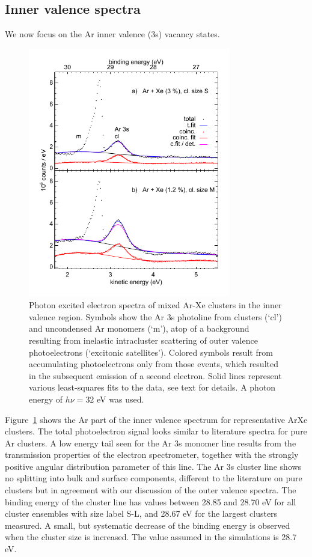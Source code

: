 \subsection{Inner valence spectra}
%
We now focus on the Ar inner valence (3s) vacancy states. 
%
\begin{figure}[ht]
 \centering
 \includegraphics[width=8.8cm]{pics/figure_ival.pdf}
 \caption{
Photon excited electron spectra of mixed Ar-Xe clusters in the inner valence region.
Symbols show the Ar 3s photoline from clusters (`cl') and uncondensed Ar monomers (`m'), atop of a background resulting from inelastic intracluster scattering of outer valence photoelectrons (`excitonic satellites'\protect\cite{hergenhahn2002}).
Colored symbols result from accumulating photoelectrons only from those events, which resulted in the subsequent emission of a second electron.
Solid lines represent various least-squares fits to the data, see text for details.
A photon energy of $h\nu = 32$ eV was used.
 \label{figure:ival}
 }
\end{figure}

Figure\ \ref{figure:ival} shows the Ar part of the inner valence spectrum for representative ArXe clusters. 
The total photoelectron signal looks similar to literature spectra for pure Ar clusters.\cite{feifel,zhang} 
A low energy tail seen for the Ar 3s monomer line results from the transmission properties of the electron spectrometer, together with the strongly positive angular distribution parameter of this line.\cite{kruit}
The Ar 3s cluster line shows no splitting into bulk and surface components, different to the literature on pure clusters but in agreement with our discussion of the outer valence spectra. 
The binding energy of the cluster line has values between 28.85 and 28.70 eV for all cluster ensembles with size label S-L, and 28.67 eV for the largest clusters measured. 
A small, but systematic decrease of the binding energy is observed when the cluster size is increased. 
The value assumed in the simulations is 28.7 eV.

